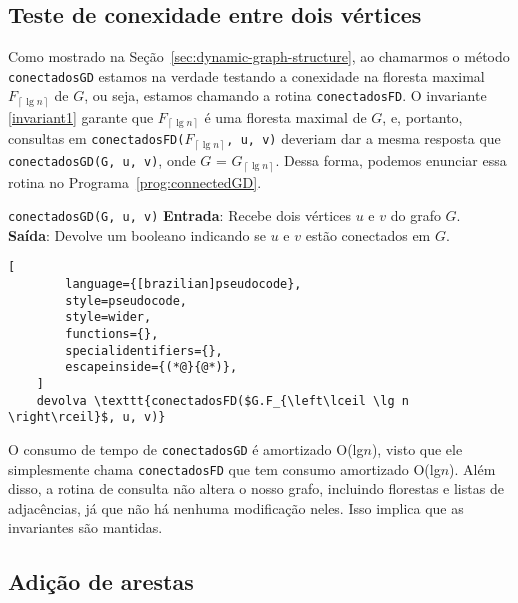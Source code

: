 \subsection{Teste de conexidade entre dois vértices}
\label{sec:code-connectivity-test}

Como mostrado na Seção~\ref{sec:dynamic-graph-structure}, ao chamarmos o método \texttt{conectadosGD} estamos na verdade testando a conexidade na floresta maximal $F_{\left\lceil \lg n \right\rceil}$ de $G$, ou seja, estamos chamando a rotina \texttt{conectadosFD}. O invariante \ref{invariant1} garante que $F_{\left\lceil \lg n \right\rceil}$ é uma floresta maximal de $G$, e, portanto, consultas em 
\texttt{conectadosFD($F_{\left\lceil \lg n \right\rceil}$, u, v)} deveriam dar a mesma resposta que \texttt{conectadosGD(G, u, v)}, onde $G$ = $G_{\left\lceil \lg n \right\rceil}$. Dessa forma, podemos enunciar essa rotina no Programa~\ref{prog:connectedGD}.

\begin{programruledcaption}{\texttt{conectadosGD(G, u, v)} \label{prog:connectedGD}}
    \noindent\textbf{Entrada}: Recebe dois vértices $u$ e $v$ do grafo $G$. \\
    \textbf{Saída}: Devolve um booleano indicando se $u$ e $v$ estão conectados em $G$.
    \vspace{-0.5\baselineskip}
    \begin{lstlisting}[
        language={[brazilian]pseudocode},
        style=pseudocode,
        style=wider,
        functions={},
        specialidentifiers={},
        escapeinside={(*@}{@*)},
    ]
    devolva \texttt{conectadosFD($G.F_{\left\lceil \lg n \right\rceil}$, u, v)}
    \end{lstlisting}
    \vspace{-0.5\baselineskip}
\end{programruledcaption}

O consumo de tempo de \texttt{conectadosGD} é amortizado O(lg$n$), visto que ele simplesmente chama \texttt{conectadosFD} que tem consumo amortizado O(lg$n$). Além disso, a rotina de consulta não altera o nosso grafo, incluindo florestas e listas de adjacências, já que não há nenhuma modificação neles. Isso implica que as invariantes são mantidas. 

\subsection{Adição de arestas}
\label{sec:code-edge-addition}

